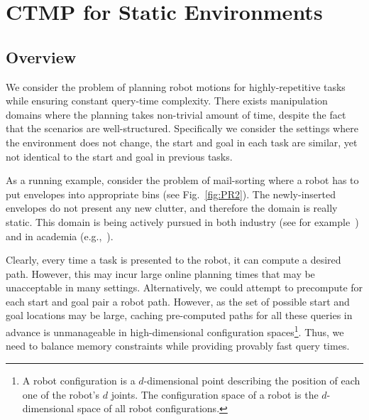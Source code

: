 \documentclass[a4paper]{report}
\begin{document}
\newpage
\chapter{CTMP for Static Environments}
\label{chap:icaps}
\section{Overview}
We consider the problem of planning robot motions for highly-repetitive tasks while ensuring constant query-time complexity. There exists manipulation domains where the planning takes non-trivial amount of time, despite the fact that the scenarios are well-structured. Specifically we consider the settings where the environment does not change, the start and goal in each task are similar, yet not identical to the start and goal in previous tasks.

As a running example, consider the problem of mail-sorting where a robot has to put envelopes into appropriate bins (see Fig.~\ref{fig:PR2}). The newly-inserted envelopes do not present any new clutter, and therefore the domain is really static. This domain is being actively pursued in both industry (see for example~\cite{DBot}) and in academia (e.g.,~\cite{hwang2015lazy}).



Clearly, every time a task is presented to the robot, it can compute a desired path.
However, this may incur large online planning times that may be unacceptable in many settings.
%
Alternatively, we could attempt to precompute for each start and goal pair a robot path.
However, as the set of possible start and goal locations may be large, caching pre-computed paths for all these queries in advance is unmanageable in high-dimensional configuration spaces\footnote{
A robot configuration is a $d$-dimensional point describing the position of each one of the robot's $d$ joints.
The configuration space of a robot is the $d$-dimensional space of all robot configurations.}.
Thus, we need to balance memory constraints while providing provably fast query times.
\end{document}
